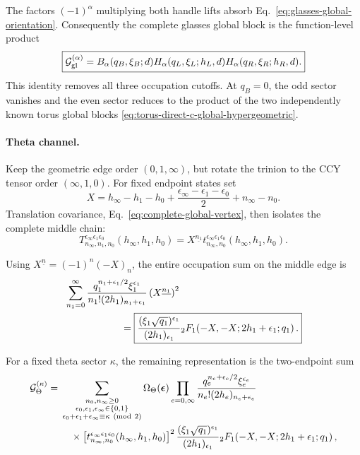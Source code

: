 \documentclass[11pt]{article}
\newcommand{\G}{\mathcal G}
\begin{document}
The factors \((-1)^\alpha\) multiplying both handle lifts absorb
Eq.~\eqref{eq:glasses-global-orientation}.  Consequently the complete
glasses global block is the function-level product
\begin{equation}
 \boxed{
 \G_{\rm gl}^{(\alpha)}
 =B_\alpha(q_B,\xi_B;d)
  H_\alpha(q_L,\xi_L;h_L,d)
  H_\alpha(q_R,\xi_R;h_R,d).}
 \label{eq:glasses-global-resummed}
\end{equation}
This identity removes all three occupation cutoffs.  At \(q_B=0\), the
odd sector vanishes and the even sector reduces to the product of the two
independently known torus global blocks
\eqref{eq:torus-direct-c-global-hypergeometric}.

\paragraph{Theta channel.}
Keep the geometric edge order \((0,1,\infty)\), but rotate the trinion to the
CCY tensor order \((\infty,1,0)\).  For fixed endpoint states set
\begin{equation}
 X=h_\infty-h_1-h_0
 +\frac{\epsilon_\infty-\epsilon_1-\epsilon_0}{2}
 +n_\infty-n_0.
 \label{eq:theta-middle-resummation-x}
\end{equation}
Translation covariance, Eq.~\eqref{eq:complete-global-vertex}, then isolates
the complete middle chain:
\begin{equation}
 T_{n_\infty,n_1,n_0}^{
   \epsilon_\infty\epsilon_1\epsilon_0}
 (h_\infty,h_1,h_0)
 =X^{\underline{n_1}}
 t_{n_\infty,n_0}^{
   \epsilon_\infty\epsilon_1\epsilon_0}
 (h_\infty,h_1,h_0).
 \label{eq:theta-middle-chain-factorization}
\end{equation}
\begin{samepage}
Using \(X^{\underline n}=(-1)^n(-X)_n\), the entire occupation sum on the
middle edge is
\begin{align}
 &\sum_{n_1=0}^{\infty}
 \frac{q_1^{n_1+\epsilon_1/2}\xi_1^{\epsilon_1}}
      {n_1!(2h_1)_{n_1+\epsilon_1}}
 \left(X^{\underline{n_1}}\right)^2
 \nonumber\\
 &\hspace{20mm}=
 \boxed{
 \frac{(\xi_1\sqrt{q_1})^{\epsilon_1}}
      {(2h_1)_{\epsilon_1}}
 {}_2F_1\!\left(-X,-X;2h_1+\epsilon_1;q_1\right).}
 \label{eq:theta-middle-edge-resummation}
\end{align}
\end{samepage}
For a fixed theta sector \(\kappa\), the remaining representation is the
two-endpoint sum
\begin{align}
 \G_\Theta^{(\kappa)}
 ={}&\sum_{\substack{n_0,n_\infty\geq0\\
       \epsilon_0,\epsilon_1,\epsilon_\infty\in\{0,1\}\\
       \epsilon_0+\epsilon_1+\epsilon_\infty\equiv\kappa\ ({\rm mod}\ 2)}}
 \Omega_\Theta(\bm\epsilon)
 \prod_{e=0,\infty}
 \frac{q_e^{n_e+\epsilon_e/2}\xi_e^{\epsilon_e}}
      {n_e!(2h_e)_{n_e+\epsilon_e}}
 \nonumber\\
 &\quad\times
 \left[t_{n_\infty,n_0}^{
   \epsilon_\infty\epsilon_1\epsilon_0}
   (h_\infty,h_1,h_0)\right]^2
 \frac{(\xi_1\sqrt{q_1})^{\epsilon_1}}
      {(2h_1)_{\epsilon_1}}
 {}_2F_1\!\left(-X,-X;2h_1+\epsilon_1;q_1\right),
 \label{eq:theta-global-middle-resummed}
\end{align}
\end{document}
